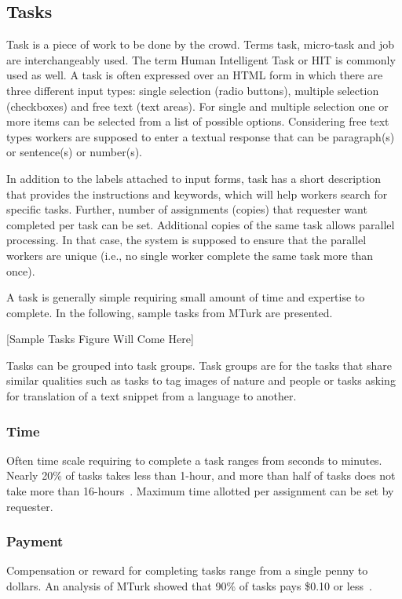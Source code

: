 \subsection{Tasks}
Task is a piece of work to be done by the crowd. Terms task, micro-task and job 
are interchangeably used. The term Human Intelligent Task or HIT is commonly 
used as well. A task is often expressed over an HTML form in which there are three 
different input types: single selection (radio buttons), multiple selection (checkboxes) 
and free text (text areas). For single and multiple selection one or more items can be 
selected from a list of possible options. Considering free text types workers are 
supposed to enter a textual response that can be paragraph(s) or sentence(s) 
or number(s).

In addition to the labels attached to input forms, task has a short description 
that provides the instructions and keywords, which will help workers search for 
specific tasks. Further, number of assignments (copies) that requester want completed 
per task can be set. Additional copies of the same task allows parallel processing. 
In that case, the system is supposed to ensure that the parallel workers are unique 
(i.e., no single worker complete the same task more than once).

A task is generally simple requiring small amount of time and expertise to complete. 
In the following, sample tasks from MTurk are presented.

[Sample Tasks Figure Will Come Here]

Tasks can be grouped into task groups. Task groups are for the tasks that share 
similar qualities such as tasks to tag images of nature and people or tasks asking
for translation of a text snippet from a language to another.

\subsubsection{Time}
Often time scale requiring to complete a task ranges from seconds to minutes. 
Nearly 20\% of tasks takes less than 1-hour, and more than half of tasks does not 
take more than 16-hours~\cite{Ipeirotis2010}. Maximum time allotted per 
assignment can be set by requester. 

\subsubsection{Payment}
Compensation or reward for completing tasks range from a single penny to dollars. 
An analysis of MTurk showed that 90\% of tasks pays \$0.10 or less~\cite{Ipeirotis2010}.

